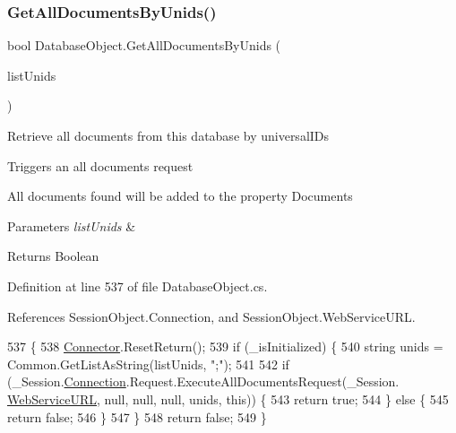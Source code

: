 \subsubsection{\texorpdfstring{Get\+All\+Documents\+By\+Unids()}{GetAllDocumentsByUnids()}\hspace{0.1cm}{\footnotesize\ttfamily [2/2]}}
{\footnotesize\ttfamily bool Database\+Object.\+Get\+All\+Documents\+By\+Unids (\begin{DoxyParamCaption}\item[{I\+List}]{list\+Unids }\end{DoxyParamCaption})}



Retrieve all documents from this database by universal\+I\+Ds 

Triggers an all documents request

All documents found will be added to the property \textquotesingle{}Documents\textquotesingle{}


\begin{DoxyParams}{Parameters}
{\em list\+Unids} & \\
\hline
\end{DoxyParams}
\begin{DoxyReturn}{Returns}
Boolean
\end{DoxyReturn}


Definition at line 537 of file Database\+Object.\+cs.



References Session\+Object.\+Connection, and Session\+Object.\+Web\+Service\+U\+RL.


\begin{DoxyCode}
537                                                         \{
538         \mbox{\hyperlink{class_connector}{Connector}}.ResetReturn();
539         \textcolor{keywordflow}{if} (\_isInitialized) \{
540             \textcolor{keywordtype}{string} unids = Common.GetListAsString(listUnids, \textcolor{stringliteral}{";"});
541 
542             \textcolor{keywordflow}{if} (\_Session.\mbox{\hyperlink{class_session_object_a014bdbf705a753540e19bfb53030c55c}{Connection}}.Request.ExecuteAllDocumentsRequest(\_Session.
      \mbox{\hyperlink{class_session_object_a697c071c812fbf7ad1166b896fb44c16}{WebServiceURL}}, null, null, null, unids, \textcolor{keyword}{this})) \{
543                 \textcolor{keywordflow}{return} \textcolor{keyword}{true};
544             \} \textcolor{keywordflow}{else} \{
545                 \textcolor{keywordflow}{return} \textcolor{keyword}{false};
546             \}
547         \}
548         \textcolor{keywordflow}{return} \textcolor{keyword}{false};
549     \}
\end{DoxyCode}
\mbox{\label{class_database_object_a9435cc20fe3a92747e509011b7726aff}} 
